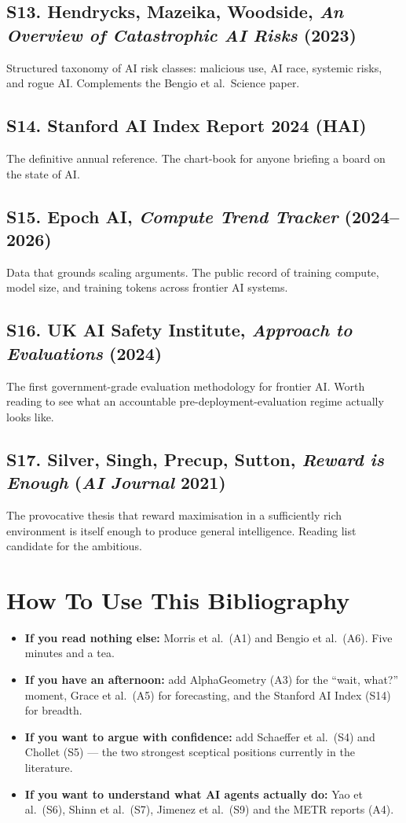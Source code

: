 \documentclass[11pt,a4paper]{article}
\begin{document}
\subsection*{S13. Hendrycks, Mazeika, Woodside, \emph{An Overview of
Catastrophic AI Risks} (2023)}
Structured taxonomy of AI risk classes: malicious use, AI race, systemic
risks, and rogue AI. Complements the Bengio et al.\ Science paper.

\subsection*{S14. Stanford AI Index Report 2024 (HAI)}
The definitive annual reference. The chart-book for anyone briefing a
board on the state of AI.

\subsection*{S15. Epoch AI, \emph{Compute Trend Tracker} (2024--2026)}
Data that grounds scaling arguments. The public record of training
compute, model size, and training tokens across frontier AI systems.

\subsection*{S16. UK AI Safety Institute, \emph{Approach to Evaluations} (2024)}
The first government-grade evaluation methodology for frontier AI.
Worth reading to see what an accountable pre-deployment-evaluation
regime actually looks like.

\subsection*{S17. Silver, Singh, Precup, Sutton, \emph{Reward is Enough}
(\emph{AI Journal} 2021)}
The provocative thesis that reward maximisation in a sufficiently rich
environment is itself enough to produce general intelligence. Reading
list candidate for the ambitious.

\section*{How To Use This Bibliography}

\begin{itemize}
    \item \textbf{If you read nothing else:} Morris et al.\ (A1) and Bengio
          et al.\ (A6). Five minutes and a tea.
    \item \textbf{If you have an afternoon:} add AlphaGeometry (A3) for the
          ``wait, what?'' moment, Grace et al.\ (A5) for forecasting, and
          the Stanford AI Index (S14) for breadth.
    \item \textbf{If you want to argue with confidence:} add Schaeffer
          et al.\ (S4) and Chollet (S5) --- the two strongest sceptical
          positions currently in the literature.
    \item \textbf{If you want to understand what AI agents actually do:}
          Yao et al.\ (S6), Shinn et al.\ (S7), Jimenez et al.\ (S9) and
          the METR reports (A4).
\end{itemize}
\end{document}
